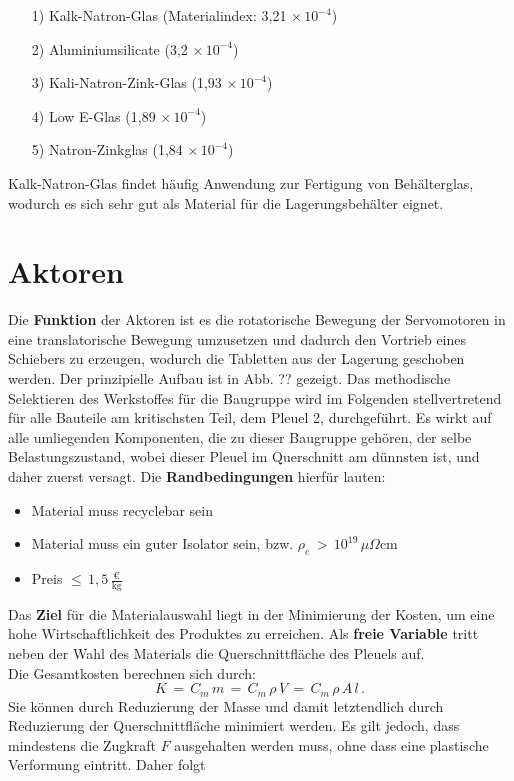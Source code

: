 \begin{itemize}
	\item[1)] Kalk-Natron-Glas (Materialindex: 3,21$\,\times10^{-4}$)
	\item[2)] Aluminiumsilicate (3,2$\,\times10^{-4}$) 
	\item[3)] Kali-Natron-Zink-Glas (1,93$\,\times10^{-4}$)
	\item[4)] Low E-Glas (1,89$\,\times10^{-4}$)
	\item[5)] Natron-Zinkglas (1,84$\,\times10^{-4}$)
\end{itemize}
Kalk-Natron-Glas findet häufig Anwendung zur Fertigung von Behälterglas, wodurch es sich sehr gut als Material für die Lagerungsbehälter eignet.

\section{Aktoren}
Die \textbf{Funktion} der Aktoren ist es die rotatorische Bewegung der Servomotoren in eine translatorische Bewegung umzusetzen und dadurch den Vortrieb eines Schiebers zu erzeugen, wodurch die Tabletten aus der Lagerung geschoben werden. Der prinzipielle Aufbau ist in Abb. ?? gezeigt. Das methodische Selektieren des Werkstoffes für die Baugruppe wird im Folgenden stellvertretend für alle Bauteile am kritischsten Teil, dem Pleuel 2, durchgeführt. Es wirkt auf alle umliegenden Komponenten, die zu dieser Baugruppe gehören, der selbe Belastungszustand, wobei dieser Pleuel im Querschnitt am dünnsten ist, und daher zuerst versagt. Die \textbf{Randbedingungen} hierfür lauten:
\begin{itemize}
	\item Material muss recyclebar sein
	\item Material muss ein guter Isolator sein, bzw. $\rho_e\,>\,10^{19}\,\mu\Omega$cm
	\item Preis $\le\,1,5\,\frac{\text{€}}{\text{kg}}$
\end{itemize}
Das \textbf{Ziel} für die Materialauswahl liegt in der Minimierung der Kosten, um eine hohe Wirtschaftlichkeit des Produktes zu erreichen. Als \textbf{freie Variable} tritt neben der Wahl des Materials die Querschnittfläche des Pleuels auf.\\
Die Gesamtkosten berechnen sich durch:
\begin{equation}
	K\,=\,C_m\,m\,=\,C_m\,\rho\,V\,=\,C_m\,\rho\,A\,l\,.
\end{equation}
Sie können durch Reduzierung der Masse und damit letztendlich durch Reduzierung der Querschnittfläche minimiert werden. Es gilt jedoch, dass mindestens die Zugkraft $F$ ausgehalten werden muss, ohne dass eine plastische Verformung eintritt. Daher folgt
